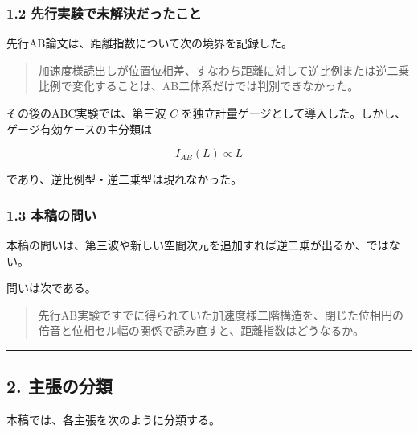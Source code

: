 \documentclass[
  a4paper,
]{ltjsarticle}
\begin{document}
\subsubsection{1.2
先行実験で未解決だったこと}\label{ux5148ux884cux5b9fux9a13ux3067ux672aux89e3ux6c7aux3060ux3063ux305fux3053ux3068}

先行AB論文は、距離指数について次の境界を記録した。

\begin{quote}
加速度様読出しが位置位相差、すなわち距離に対して逆比例または逆二乗比例で変化することは、AB二体系だけでは判別できなかった。
\end{quote}

その後のABC実験では、第三波 \(C\)
を独立計量ゲージとして導入した。しかし、ゲージ有効ケースの主分類は

\[
I_{AB}(L)\propto L
\]

であり、逆比例型・逆二乗型は現れなかった。

\subsubsection{1.3 本稿の問い}\label{ux672cux7a3fux306eux554fux3044}

本稿の問いは、第三波や新しい空間次元を追加すれば逆二乗が出るか、ではない。

問いは次である。

\begin{quote}
先行AB実験ですでに得られていた加速度様二階構造を、閉じた位相円の倍音と位相セル幅の関係で読み直すと、距離指数はどうなるか。
\end{quote}

\begin{center}\rule{0.5\linewidth}{0.5pt}\end{center}

\subsection{2. 主張の分類}\label{ux4e3bux5f35ux306eux5206ux985e}

本稿では、各主張を次のように分類する。
\end{document}

